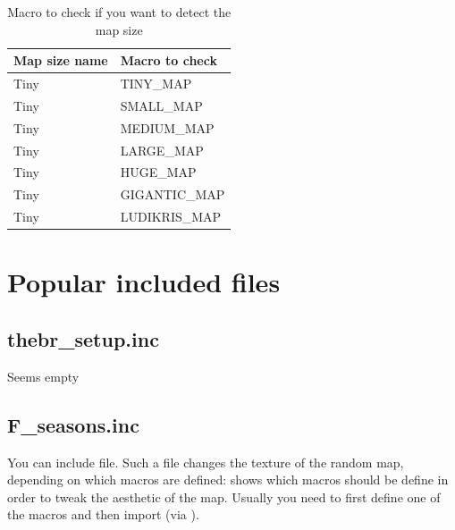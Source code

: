 \begin{appendices}
    \begin{table}
        \centering
        \begin{tabular}{ll}
            \toprule
            Map size name & Macro to check \\
            \midrule
            Tiny & TINY\_MAP \\
            Tiny & SMALL\_MAP \\
            Tiny & MEDIUM\_MAP \\
            Tiny & LARGE\_MAP \\
            Tiny & HUGE\_MAP \\
            Tiny & GIGANTIC\_MAP \\
            Tiny & LUDIKRIS\_MAP \\
            \bottomrule
        \end{tabular}
        \caption{Macro to check if you want to detect the map size}
        \label{tbl:mapsizemacro}
    \end{table}

    \section{Popular included files}

    \subsection{thebr\_setup.inc}

    Seems empty

    \subsection{F\_seasons.inc}

    You can include  file. Such a file changes the texture of the random map, depending on which macros are defined:  shows which macros should be define in order to tweak the aesthetic of the map. Usually you need to first define one of the macros and then import  (via ).


\end{appendices}

